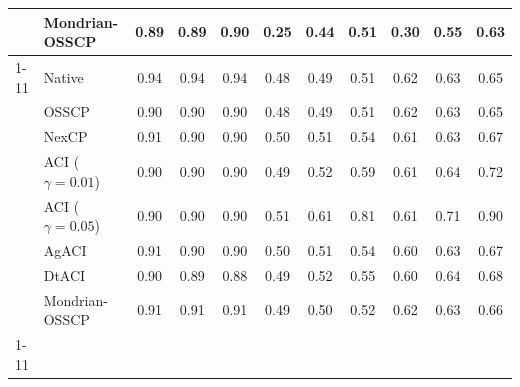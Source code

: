 \begin{tabular}{@{}llccccccccc@{}}
 & Mondrian-OSSCP & 0.89 & 0.89 & 0.90 & 0.25 & 0.44 & 0.51 & 0.30 & 0.55 & 0.63 \\
\cmidrule{1-11}
\multirow[t]{8}{*}{GEFS power curve} & Native & 0.94 & 0.94 & 0.94 & 0.48 & 0.49 & 0.51 & 0.62 & 0.63 & 0.65 \\
 & OSSCP & 0.90 & 0.90 & 0.90 & 0.48 & 0.49 & 0.51 & 0.62 & 0.63 & 0.65 \\
 & NexCP & 0.91 & 0.90 & 0.90 & 0.50 & 0.51 & 0.54 & 0.61 & 0.63 & 0.67 \\
 & ACI ($\gamma=0.01$) & 0.90 & 0.90 & 0.90 & 0.49 & 0.52 & 0.59 & 0.61 & 0.64 & 0.72 \\
 & ACI ($\gamma=0.05$) & 0.90 & 0.90 & 0.90 & 0.51 & 0.61 & 0.81 & 0.61 & 0.71 & 0.90 \\
 & AgACI & 0.91 & 0.90 & 0.90 & 0.50 & 0.51 & 0.54 & 0.60 & 0.63 & 0.67 \\
 & DtACI & 0.90 & 0.89 & 0.88 & 0.49 & 0.52 & 0.55 & 0.60 & 0.64 & 0.68 \\
 & Mondrian-OSSCP & 0.91 & 0.91 & 0.91 & 0.49 & 0.50 & 0.52 & 0.62 & 0.63 & 0.66 \\
\cmidrule{1-11}
\bottomrule
\end{tabular}
